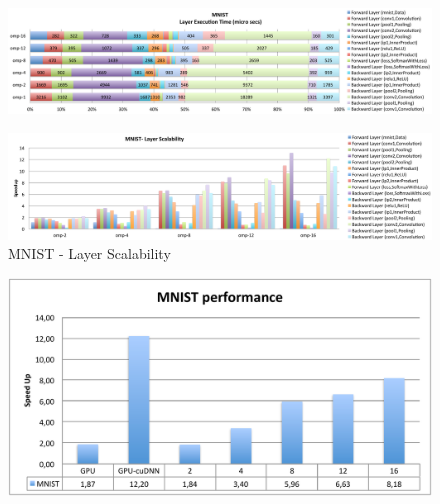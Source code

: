 
\begin{figure}[h]
\includegraphics[width=\linewidth]{figures/mnist-rel-abs-time.pdf}
\caption{}
\end{figure}

\begin{figure}[h]
\includegraphics[width=\textwidth]{figures/mnist-scalability-layer.pdf}
\caption{MNIST - Layer Scalability}
\end{figure}

\begin{figure}[b]
\includegraphics[width=\linewidth]{figures/mnist-abs-perf-all.pdf}
\caption{}
\end{figure}


